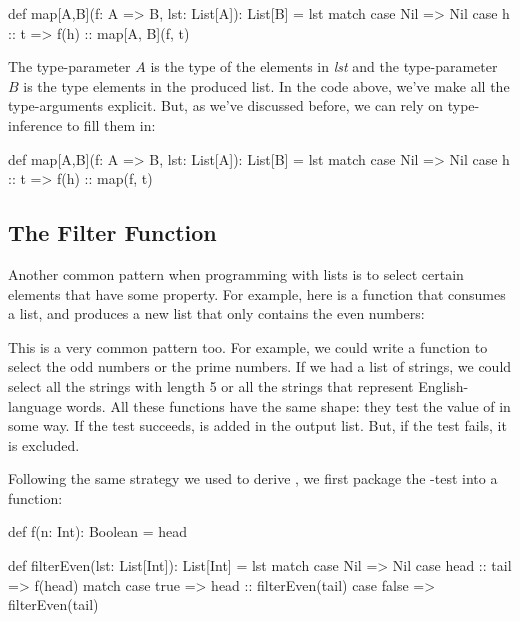 \documentclass{book}
\begin{document}
\begin{scalacode}
def map[A,B](f: A => B, lst: List[A]): List[B] = lst match {
  case Nil => Nil
  case h :: t => f(h) :: map[A, B](f, t)
}
\end{scalacode}

The type-parameter $A$ is the type of the elements in
\emph{lst} and the type-parameter $B$ is the type elements in the produced list.
In the code above, we've make all the type-arguments explicit. But, as we've
discussed before, we can rely on type-inference to fill them in:

\begin{scalacode}
def map[A,B](f: A => B, lst: List[A]): List[B] = lst match {
  case Nil => Nil
  case h :: t => f(h) :: map(f, t)
}
\end{scalacode}

\subsection{The Filter Function}

Another common pattern when programming with lists is to select certain elements
that have some property. For example, here is a function that consumes a list,
and produces a new list that only contains the even numbers:


This is a very common pattern too. For example, we could write a function to
select the odd numbers or the prime numbers. If we had a list of strings, we
could select all the strings with length 5 or all the strings that represent
English-language words. All these functions have the same shape: they test
the value of  in some way. If the test succeeds,  is added in
the output list. But, if the test fails, it is excluded.

Following the same strategy we used to derive , we first package
the -test into a function:

\begin{scalacode}
def f(n: Int): Boolean = head %

def filterEven(lst: List[Int]): List[Int] = lst match {
  case Nil => Nil
  case head :: tail =>
    f(head) match {
      case true => head :: filterEven(tail)
      case false => filterEven(tail)
    }
}
\end{scalacode}
\end{document}
